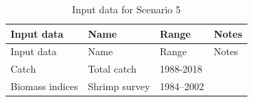 \documentclass[
]{article}
\begin{document}
\begin{longtable}[]{@{}llll@{}}
\caption{Input data for Scenario 5}\tabularnewline
\toprule
\begin{minipage}[b]{0.21\columnwidth}\raggedright
Input data\strut
\end{minipage} & \begin{minipage}[b]{0.20\columnwidth}\raggedright
Name\strut
\end{minipage} & \begin{minipage}[b]{0.15\columnwidth}\raggedright
Range\strut
\end{minipage} & \begin{minipage}[b]{0.33\columnwidth}\raggedright
Notes\strut
\end{minipage}\tabularnewline
\midrule
\endfirsthead
\toprule
\begin{minipage}[b]{0.21\columnwidth}\raggedright
Input data\strut
\end{minipage} & \begin{minipage}[b]{0.20\columnwidth}\raggedright
Name\strut
\end{minipage} & \begin{minipage}[b]{0.15\columnwidth}\raggedright
Range\strut
\end{minipage} & \begin{minipage}[b]{0.33\columnwidth}\raggedright
Notes\strut
\end{minipage}\tabularnewline
\midrule
\endhead
\begin{minipage}[t]{0.21\columnwidth}\raggedright
Catch\strut
\end{minipage} & \begin{minipage}[t]{0.20\columnwidth}\raggedright
Total catch\strut
\end{minipage} & \begin{minipage}[t]{0.15\columnwidth}\raggedright
1988-2018\strut
\end{minipage} & \begin{minipage}[t]{0.33\columnwidth}\raggedright
\strut
\end{minipage}\tabularnewline
\begin{minipage}[t]{0.21\columnwidth}\raggedright
Biomass indices\strut
\end{minipage} & \begin{minipage}[t]{0.20\columnwidth}\raggedright
Shrimp survey\strut
\end{minipage} & \begin{minipage}[t]{0.15\columnwidth}\raggedright
1984--2002\strut
\end{minipage} & \begin{minipage}[t]{0.33\columnwidth}\raggedright

\end{minipage}
\end{longtable}
\end{document}
